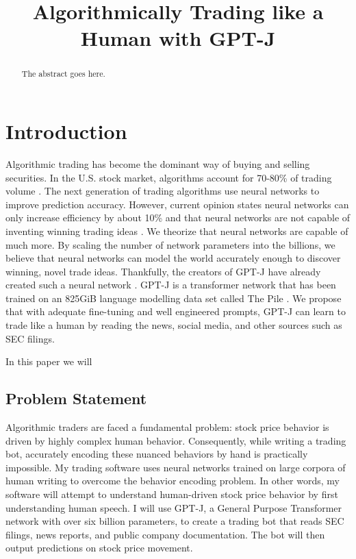 \documentclass[conference]{IEEEtran}
\begin{document}
\title{Algorithmically Trading like a Human with GPT-J}

\author{
}

\maketitle

\begin{abstract}
The abstract goes here.
\end{abstract}

\section{Introduction}
Algorithmic trading has become the dominant way of buying and selling securities. In the U.S. stock market, algorithms account for 70-80\% of trading volume \cite{Samuelsson2021}. The next generation of trading algorithms use neural networks to improve prediction accuracy. However, current opinion states neural networks can only increase efficiency by about 10\% and that neural networks are not capable of inventing winning trading ideas \cite{Vonko2021}. We theorize that neural networks are capable of much more. By scaling the number of network parameters into the billions, we believe that neural networks can model the world accurately enough to discover winning, novel trade ideas. Thankfully, the creators of GPT-J have already created such a neural network \cite{mesh-transformer-jax}. GPT-J is a transformer network \cite{Vaswani2017} that has been trained on an 825GiB language modelling data set called The Pile \cite{Gao2021}. We propose that with adequate fine-tuning and well engineered prompts, GPT-J can learn to trade like a human by reading the news, social media, and other sources such as SEC filings.

In this paper we will 

\subsection{\textbf{Problem Statement}}
Algorithmic traders are faced a fundamental problem: stock price behavior is driven by highly complex human behavior. Consequently, while writing a trading bot, accurately encoding these nuanced behaviors by hand is practically impossible. My trading software uses neural networks trained on large corpora of human writing to overcome the behavior encoding problem. In other words, my software will attempt to understand human-driven stock price behavior by first understanding human speech. I will use GPT-J, a General Purpose Transformer network with over six billion parameters, to create a trading bot that reads SEC filings, news reports, and public company documentation. The bot will then output predictions on stock price movement.
\end{document}
